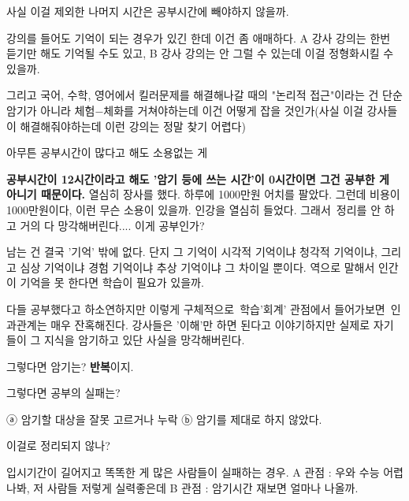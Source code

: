 사실 이걸 제외한 나머지 시간은 공부시간에 빼야하지 않을까.
\vspace{5mm}

강의를 들어도 기억이 되는 경우가 있긴 한데 이건 좀 애매하다.
A 강사 강의는 한번 듣기만 해도 기억될 수도 있고, B 강사 강의는 안 그럴 수 있는데 이걸 정형화시킬 수 있을까.
\vspace{5mm}

그리고 국어, 수학, 영어에서 킬러문제를 해결해나갈 때의 "논리적 접근"이라는 건 단순 암기가 아니라
체험$-$체화를 거쳐야하는데 이건 어떻게 잡을 것인가(사실 이걸 강사들이 해결해줘야하는데 이런 강의는 정말 찾기 어렵다)
\vspace{5mm}

아무튼 공부시간이 많다고 해도 소용없는 게
\vspace{5mm}

\textbf{공부시간이 12시간이라고 해도 '암기 등에 쓰는 시간'이 0시간이면 그건 공부한 게 아니기 때문이다.}
열심히 장사를 했다. 하루에 1000만원 어치를 팔았다. 그런데 비용이 1000만원이다, 이런 무슨 소용이 있을까.
인강을 열심히 들었다. 그래서 정리를 안 하고 거의 다 망각해버린다.... 이게 공부인가?
\vspace{5mm}

남는 건 결국 '기억' 밖에 없다.
단지 그 기억이 시각적 기억이냐 청각적 기억이냐,
그리고 심상 기억이냐 경험 기억이냐 추상 기억이냐 그 차이일 뿐이다.
역으로 말해서 인간이 기억을 못 한다면 학습이 필요가 있을까.
\vspace{5mm}

다들 공부했다고 하소연하지만 이렇게 구체적으로 학습'회계' 관점에서 들어가보면 인과관계는 매우 잔혹해진다.
강사들은 '이해'만 하면 된다고 이야기하지만 실제로 자기들이 그 지식을 암기하고 있단 사실을 망각해버린다.
\vspace{5mm}

그렇다면 암기는?
\textbf{반복}이지.
\vspace{5mm}

그렇다면 공부의 실패는?
\vspace{5mm}

ⓐ 암기할 대상을 잘못 고르거나 누락
ⓑ 암기를 제대로 하지 않았다.
\vspace{5mm}

이걸로 정리되지 않나?
\vspace{5mm}

입시기간이 길어지고 똑똑한 게 많은 사람들이 실패하는 경우.
A 관점 : 우와 수능 어렵나봐, 저 사람들 저렇게 실력좋은데
B 관점 : 암기시간 재보면 얼마나 나올까.
\vspace{5mm}

